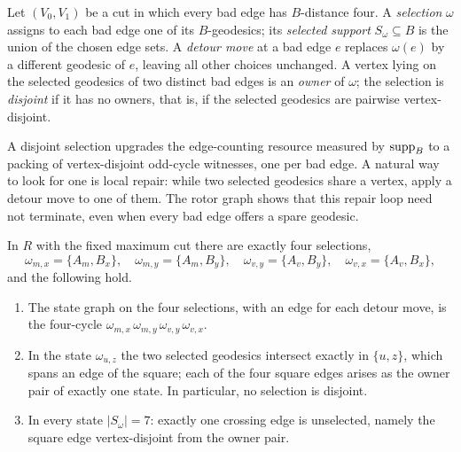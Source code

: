 \begin{definition}\label{def:rotor8-selection}
Let \((V_0,V_1)\) be a cut in which every bad edge has \(B\)-distance
four. A \emph{selection} \(\omega\) assigns to each bad edge one of its
\(B\)-geodesics; its \emph{selected support}
\(S_\omega\subseteq B\) is the union of the chosen edge sets. A
\emph{detour move} at a bad edge \(e\) replaces \(\omega(e)\) by a
different geodesic of \(e\), leaving all other choices unchanged. A
vertex lying on the selected geodesics of two distinct bad edges is an
\emph{owner} of \(\omega\); the selection is \emph{disjoint} if it has
no owners, that is, if the selected geodesics are pairwise
vertex-disjoint.
\end{definition}

A disjoint selection upgrades the edge-counting resource measured by
\(\operatorname{supp}_B\) to a packing of vertex-disjoint odd-cycle witnesses, one
per bad edge. A natural way to look for one is local repair: while two
selected geodesics share a vertex, apply a detour move to one of them.
The rotor graph shows that this repair loop need not terminate, even
when every bad edge offers a spare geodesic.

\begin{theorem}\label{thm:rotor8-states}
In \(R\) with the fixed maximum cut there are exactly four selections,
\[
 \omega_{m,x}=\{A_m,B_x\},\quad
 \omega_{m,y}=\{A_m,B_y\},\quad
 \omega_{v,y}=\{A_v,B_y\},\quad
 \omega_{v,x}=\{A_v,B_x\},
\]
and the following hold.
\begin{enumerate}[label=\textup{(\roman*)}]
\item The state graph on the four selections, with an edge for each
detour move, is the four-cycle
\(\omega_{m,x}\,\omega_{m,y}\,\omega_{v,y}\,\omega_{v,x}\).
\item In the state \(\omega_{u,z}\) the two selected geodesics
intersect exactly in \(\{u,z\}\), which spans an edge of the square;
each of the four square edges arises as the owner pair of exactly one
state. In particular, no selection is disjoint.
\item In every state \(|S_\omega|=7\): exactly one crossing edge is
unselected, namely the square edge vertex-disjoint from the owner pair.
\end{enumerate}
\end{theorem}

